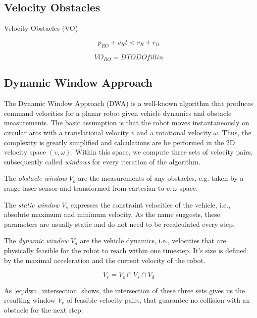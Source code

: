 \subsection{Velocity Obstacles}
Velocity Obstacles (VO) \citep{fiorini1998motion}

\begin{equation}
p_{RO} + v_R t < r_R +r_O
	\label{eq:vo_condition}
\end{equation}

\begin{equation}
VO_{RO} = D TODO fill in
\end{equation}
\subsection{Dynamic Window Approach}
The Dynamic Window Approach (DWA) \citep{fox1997dynamic} is a well-known algorithm that produces command velocities for a planar robot given vehicle dynamics and obstacle measurements. The basic assumption is that the robot moves instantaneously on circular arcs with a translational velocity $v$ and a rotational velocity $\omega$. Thus, the complexity is greatly simplified and calculations are be performed in the 2D velocity space $(v,\omega)$. Within this space, we compute three sets of velocity pairs,  subsequently called \emph{windows} for every iteration of the algorithm.

The \emph{obstacle window} $V_o$ are the measurements of any obstacles, e.g. taken by a range laser sensor and transformed from cartesian to $v,\omega$ space.

The \emph{static window} $V_s$ expresses the constraint velocities of the vehicle, i.e., absolute maximum and minimum velocity. As the name suggests, these parameters are usually static and do not need to be recalculated every step.

The \emph{dynamic window} $V_d$ are the vehicle dynamics, i.e., velocities that are physically feasible for the robot to reach within one timestep. It's size is defined by the maximal acceleration and the current velocity of the robot.

\begin{equation}
V_r = V_o \cap V_s \cap V_d
 	\label{eq:dwa_intersection}
\end{equation}

As \cref{eq:dwa_intersection} shows, the intersection of these three sets gives us the resulting window $V_r$ of feasible velocity pairs, that guarantee no collision with an obstacle for the next step.


